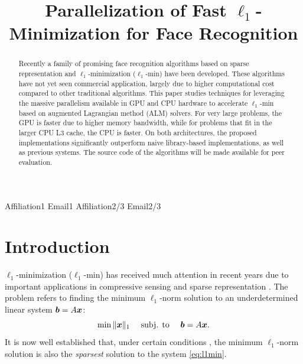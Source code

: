 \documentclass[preprint]{sigplanconf}
\begin{document}
\copyrightdata{[to be supplied]} 


\title{Parallelization of Fast $\ell_1$-Minimization for Face Recognition}

		   {Affiliation1}
		   {Email1}
		   {Affiliation2/3}
		   {Email2/3}

\maketitle

\begin{abstract} Recently a family of promising face recognition algorithms
based on sparse representation and $\ell_1$-minimization ($\ell_1$-min) have been
developed.  These algorithms have not yet seen commercial application, 
largely due to higher computational cost compared to other traditional
algorithms. This paper studies techniques for leveraging the 
massive parallelism available in GPU and CPU hardware to accelerate
$\ell_1$-min based on augmented Lagrangian method (ALM) solvers. 
For very large problems, the GPU is faster due to higher memory bandwidth, while 
for problems that fit in the larger CPU L3 cache, the CPU is faster.
On both architectures, the proposed implementations significantly outperform
naive library-based implementations, as well as previous systems. 
The source code of the
algorithms will be made available for peer evaluation.  \end{abstract}

\section{Introduction} 
$\ell_1$-minimization ($\ell_1$-min) has received much attention in recent
years due to important applications in compressive sensing
\cite{BrucksteinA2007} and sparse representation \cite{WrightJ2010-PIEEE}.  
The problem refers to finding the minimum $\ell_1$-norm solution to an
underdetermined linear system ${\boldsymbol{b}}=A{\boldsymbol{x}}$:
\begin{equation}
\min \|{\boldsymbol{x}}\|_1\quad \mbox{ subj. to }\quad {\boldsymbol{b}} = A{\boldsymbol{x}}.
\label{eq:l1min}
\end{equation}
It is now well established that, under certain conditions
\cite{CandesE2005-IT_1,DonohoD2004}, the minimum $\ell_1$-norm solution is also
the \emph{sparsest} solution to the system \eqref{eq:l1min}.
\end{document}
